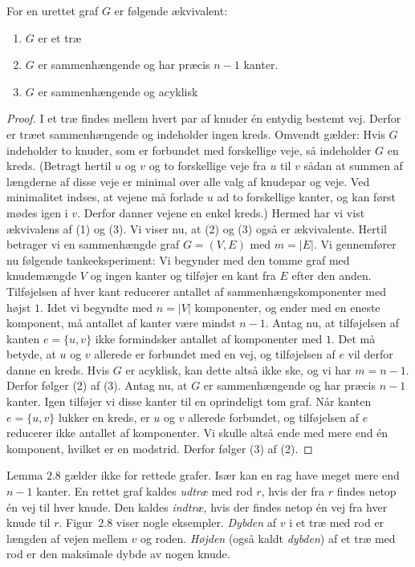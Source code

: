 \begin{lem}
  For en urettet graf $G$ er følgende ækvivalent:
  \begin{enumerate}[(1)]
    \item $G$ er et træ
    \item $G$ er sammenhængende og har præcis $n-1$ kanter.
    \item $G$ er sammenhængende og acyklisk
  \end{enumerate}

\end{lem}
\begin{proof}
I et træ findes mellem hvert par af knuder én entydig bestemt vej.
Derfor er træet sammenhængende og indeholder ingen kreds.
Omvendt gælder:
Hvis $G$ indeholder to knuder, som er forbundet med forskellige veje, så indeholder $G$ en kreds.
(Betragt hertil $u$ og $v$ og to forskellige veje fra $u$ til $v$ sådan at summen af længderne af disse veje er minimal over alle valg af knudepar og veje.
Ved minimalitet indses, at vejene må forlade $u$ ad to forskellige kanter, og kan først mødes igen i $v$.
Derfor danner vejene en enkel kreds.)
Hermed har vi vist ækvivalens af (1) og (3).
Vi viser nu, at (2) og (3) også er ækvivalente.
Hertil betrager vi en sammenhængde graf $G=(V,E)$ med $m=|E|$.
Vi gennemfører nu følgende tankeeksperiment:
Vi begynder med den tomme graf
med knudemængde $V$ og ingen kanter og tilføjer en kant fra $E$ efter den anden.
Tilføjelsen af hver kant reducerer antallet af sammenhængskomponenter med højst $1$.
Idet vi begyndte med $n=|V|$ komponenter, og ender med en eneste komponent, må antallet af kanter være mindst $n-1$.
Antag nu, at tilføjelsen af kanten $e=\{u,v\}$ ikke formindsker antallet af komponenter med $1$.
Det må betyde, at $u$ og $v$ allerede er forbundet med en vej, og tilføjelsen af $e$ vil derfor danne en kreds.
Hvis $G$ er acyklisk, kan dette altså ikke ske, og vi har $m=n-1$.
Derfor følger (2) af (3).
Antag nu, at $G$ er sammenhængende og har præcis $n-1$ kanter.
Igen tilføjer vi disse kanter til en oprindeligt tom graf.
Når kanten $e=\{u,v\}$ lukker en kreds, er $u$ og $v$ allerede forbundet, og tilføjelsen af $e$ reducerer ikke antallet af komponenter.
Vi skulle altså ende med mere end én komponent, hvilket er en modstrid.
Derfor følger (3) af (2).
\end{proof}

Lemma 2.8 gælder ikke for rettede grafer.
Især kan en rag have meget mere end $n-1$ kanter.
En rettet graf kaldes \emph{udtræ} med rod $r$, hvis der fra $r$ findes netop én vej til hver knude.
Den kaldes \emph{indtræ}, hvis der findes netop én vej fra hver knude til $r$.
Figur~2.8 viser nogle eksempler.
\emph{Dybden} af $v$ i et træ med rod er længden af vejen mellem $v$ og roden.
\emph{Højden} (også kaldt \emph{dybden}) af et træ med rod er den maksimale dybde av nogen knude.

